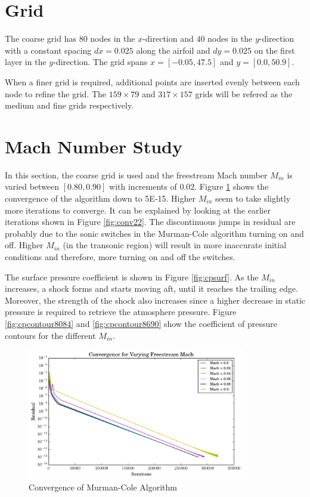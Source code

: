 \documentclass[letterpaper,12pt,]{article}
\begin{document}



\section*{Grid}

The coarse grid has $80$ nodes in the $x$-direction and $40$ nodes in the $y$-direction with a constant spacing $dx = 0.025$ along the airfoil and $dy=0.025$ on the first layer in the $y$-direction.
The grid spans $x=[-0.05, 47.5]$ and $y=[0.0, 50.9]$.

When a finer grid is required, additional points are inserted evenly between each node to refine the grid.
The $159 \times 79$ and $317 \times 157$ grids will be refered as the medium and fine grids respectively.

\section*{Mach Number Study}

In this section, the coarse grid is used and the freestream Mach number $M_{in}$ is varied between $[0.80,0.90]$ with increments of $0.02$.
Figure \ref{fig:conv2} shows the convergence of the algorithm down to 5\textsc{E-}15.
Higher $M_{in}$ seem to take slightly more iterations to converge.
It can be explained by looking at the earlier iterations shown in Figure \ref{fig:conv22}.
The discontinuous jumps in residual are probably due to the sonic switches in the Murman-Cole algorithm turning on and off.
Higher $M_{in}$ (in the transonic region) will result in more inaccurate initial conditions and therefore, more turning on and off the switches.

The surface pressure coefficient is shown in Figure \ref{fig:cpsurf}.
As the $M_{in}$ increases, a shock forms and starts moving aft, until it reaches the trailing edge.
Moreover, the strength of the shock also increases since a higher decrease in static pressure is required to retrieve the atmosphere pressure.
Figure \ref{fig:cpcontour8084} and \ref{fig:cpcontour8690} show the coefficient of pressure contours for the different $M_{in}$.

\begin{figure}[!h]
    \centering
    \includegraphics[width = 0.85\textwidth]{./Figures/convergenceq2.pdf}
    \caption{Convergence of Murman-Cole Algorithm}
    \label{fig:conv2}
\end{figure}
\end{document}
